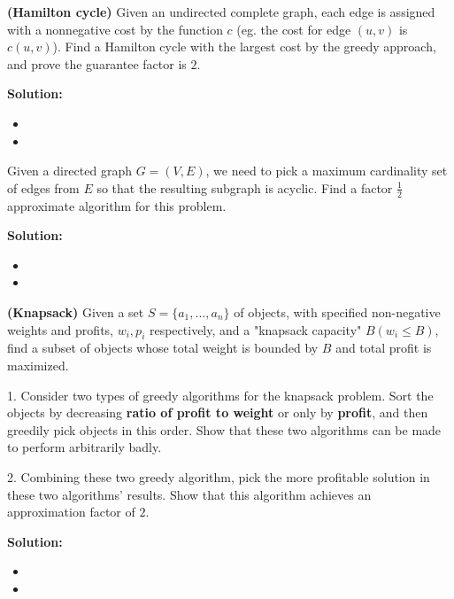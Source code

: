 \documentclass{article}
\newcounter{exercise}
\newcommand{\<}{
    \langle}
\renewcommand{\>}{
    \rangle}
\begin{document}
{\begin{exercise}
	\textbf{(Hamilton cycle)} Given an undirected complete graph, each edge is assigned with a nonnegative cost by the function $c$ (eg. the cost for edge $(u,v)$ is $c(u,v)$). Find a Hamilton cycle with the largest cost by the greedy approach, and prove the guarantee factor is $2$.
\end{exercise}

\textbf{Solution:}
\begin{itemize}
	\item
	\item
\end{itemize}
\newpage




\begin{exercise}
	Given a directed graph $G=(V,E)$, we need to pick a maximum cardinality set of edges from $E$ so that the resulting subgraph is acyclic. Find a factor $\frac{1}{2}$ approximate algorithm for this problem.
\end{exercise}

\textbf{Solution:}
\begin{itemize}
	\item
	\item
\end{itemize}
\newpage





\begin{exercise}
	\textbf{(Knapsack)} Given a set $S = \{a_1, ... , a_n\}$ of objects, with specified non-negative weights and profits, $w_i,p_i$ respectively, and a "knapsack capacity" $B (w_i \le B)$, find a subset of objects whose total weight is bounded by $B$ and total profit is maximized.
	
	1. Consider two types of greedy algorithms for the knapsack problem. Sort the objects by decreasing \textbf{ratio of profit to weight} or only by \textbf{profit}, and then greedily pick objects in this order. Show that these two algorithms can be made to perform arbitrarily badly.
	
	2. Combining these two greedy algorithm, pick the more profitable solution in these two algorithms' results. Show that this algorithm achieves an approximation factor of $2$.
\end{exercise}

\textbf{Solution:}
\begin{itemize}
	\item
	\item
\end{itemize}
\newpage




}
\end{document}
